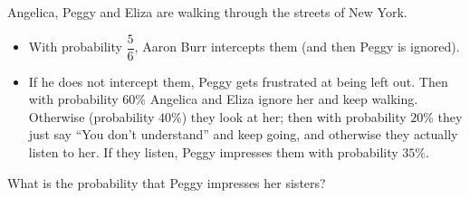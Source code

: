 Angelica, Peggy and Eliza are walking through the streets of New York.
\begin{itemize}
\item With probability $\dfrac56$, Aaron Burr intercepts them (and then Peggy is ignored).
\item If he does not intercept them, Peggy gets frustrated at being left out. Then with probability $60\%$ Angelica and Eliza ignore her and keep walking. Otherwise (probability $40\%$) they look at her; then with probability $20\%$ they just say ``You don't understand'' and keep going, and otherwise they actually listen to her. If they listen, Peggy impresses them with probability $35\%$.
\end{itemize}
What is the probability that Peggy impresses her sisters?
